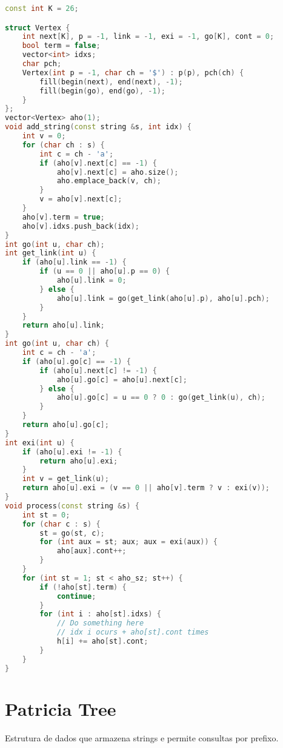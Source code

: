\documentclass[11pt, a4paper, oneside]{book}
\begin{document}
\hfill

\begin{multicols}{2}
\begin{lstlisting}[language=C++]
const int K = 26;

struct Vertex {
    int next[K], p = -1, link = -1, exi = -1, go[K], cont = 0;
    bool term = false;
    vector<int> idxs;
    char pch;
    Vertex(int p = -1, char ch = '$') : p(p), pch(ch) {
        fill(begin(next), end(next), -1);
        fill(begin(go), end(go), -1);
    }
};
vector<Vertex> aho(1);
void add_string(const string &s, int idx) {
    int v = 0;
    for (char ch : s) {
        int c = ch - 'a';
        if (aho[v].next[c] == -1) {
            aho[v].next[c] = aho.size();
            aho.emplace_back(v, ch);
        }
        v = aho[v].next[c];
    }
    aho[v].term = true;
    aho[v].idxs.push_back(idx);
}
int go(int u, char ch);
int get_link(int u) {
    if (aho[u].link == -1) {
        if (u == 0 || aho[u].p == 0) {
            aho[u].link = 0;
        } else {
            aho[u].link = go(get_link(aho[u].p), aho[u].pch);
        }
    }
    return aho[u].link;
}
int go(int u, char ch) {
    int c = ch - 'a';
    if (aho[u].go[c] == -1) {
        if (aho[u].next[c] != -1) {
            aho[u].go[c] = aho[u].next[c];
        } else {
            aho[u].go[c] = u == 0 ? 0 : go(get_link(u), ch);
        }
    }
    return aho[u].go[c];
}
int exi(int u) {
    if (aho[u].exi != -1) {
        return aho[u].exi;
    }
    int v = get_link(u);
    return aho[u].exi = (v == 0 || aho[v].term ? v : exi(v));
}
void process(const string &s) {
    int st = 0;
    for (char c : s) {
        st = go(st, c);
        for (int aux = st; aux; aux = exi(aux)) {
            aho[aux].cont++;
        }
    }
    for (int st = 1; st < aho_sz; st++) {
        if (!aho[st].term) {
            continue;
        }
        for (int i : aho[st].idxs) {
            // Do something here
            // idx i ocurs + aho[st].cont times
            h[i] += aho[st].cont;
        }
    }
}
\end{lstlisting}
\end{multicols}

\hfill

\section{Patricia Tree}


Estrutura de dados que armazena strings e permite consultas por prefixo.
\end{document}
